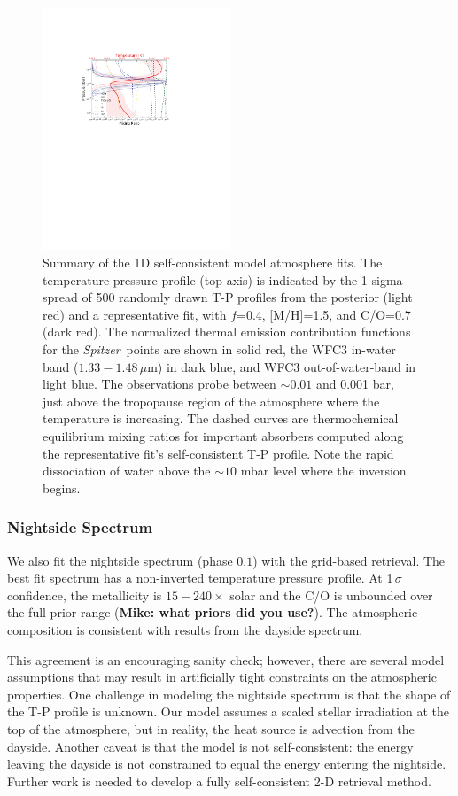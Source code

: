 \documentclass[twocolumn]{aastex61}
\newcommand{\project}[1]{\textsl{#1}}
\newcommand{\Spitzer}{\project{Spitzer}}
\begin{document}
\begin{figure}
\includegraphics[width = 0.5\textwidth]{Figures/atmosphere_summary.pdf}
\caption{Summary of the 1D self-consistent model atmosphere fits.  The temperature-pressure profile (top axis) is indicated by the 1-sigma spread of 500 randomly drawn T-P profiles from the posterior (light red) and a representative fit, with $f$=0.4, [M/H]=1.5, and C/O=0.7 (dark red).  The normalized thermal emission contribution functions for the \Spitzer\ points are shown in solid red, the WFC3 in-water band ($1.33-1.48\,\mu$m) in dark blue, and WFC3 out-of-water-band in light blue.  The observations probe between $\sim0.01$ and 0.001 bar, just above the tropopause region of the atmosphere where the temperature is increasing.  The dashed curves are thermochemical equilibrium mixing ratios for important absorbers computed along the representative fit's self-consistent T-P profile.  Note the rapid dissociation of water above the $\sim10$ mbar level where the inversion begins.}
\label{fig:summary}
\end{figure}

\subsubsection{Nightside Spectrum}
We also fit the nightside spectrum (phase $0.1$) with the grid-based retrieval. The best fit spectrum has a non-inverted temperature pressure profile.  At 1\,$\sigma$ confidence, the metallicity is $15 - 240\times$ solar and the C/O is unbounded over the full prior range (\textbf{Mike: what priors did you use?}). The atmospheric composition is consistent with results from the dayside spectrum. 

This agreement is an encouraging sanity check; however, there are several model assumptions that may result in artificially tight constraints on the atmospheric properties.  One challenge in modeling the nightside spectrum is that the shape of the T-P profile is unknown.  Our model assumes a scaled stellar irradiation at the top of the atmosphere, but in reality, the heat source is advection from the dayside. Another caveat is that the model is not self-consistent: the energy leaving the dayside is not constrained to equal the energy entering the nightside.  Further work is needed to develop a fully self-consistent 2-D retrieval method. 
\end{document}
